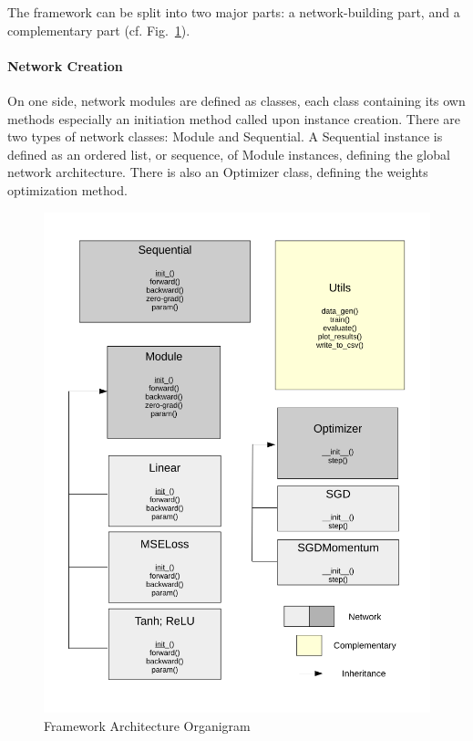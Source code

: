 \documentclass[10pt, a4paper]{article}
\begin{document}
The framework can be split into two major parts: a network-building part, and a complementary part (cf. Fig.~\ref{fig:arch_org}). 
\paragraph{Network Creation}
On one side, network modules are defined as classes, each class containing its own methods especially an initiation method called upon instance creation. There are two types of network classes: Module and Sequential. A Sequential instance is defined as an ordered list, or sequence, of Module instances, defining the global network architecture. There is also an Optimizer class, defining the weights optimization method. 
\begin{figure}
	\begin{centering}
		\includegraphics[scale=0.4]{architecture_org.png}
		\caption{Framework Architecture Organigram}
		\label{fig:arch_org}
	\end{centering}
\end{figure}
\end{document}
